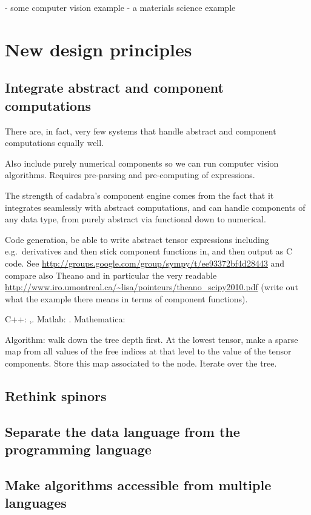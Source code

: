 \documentclass[11pt]{article}
\begin{document}
- some computer vision example
- a materials science example


\section{New design principles}
\subsection{Integrate abstract and component computations}

There are, in fact, very few systems that handle abstract and
component computations equally well.

Also include purely numerical components so we can run computer vision
algorithms. Requires pre-parsing and pre-computing of expressions.

The strength of cadabra's component engine comes from the fact that it
integrates seamlessly with abstract computations, and can handle
components of any data type, from purely abstract via functional down
to numerical.

Code generation, be able to write abstract tensor expressions
including e.g.~derivatives and then stick component functions in, and
then output as C code. See
\url{http://groups.google.com/group/sympy/t/ee93372bf4d28443}
and compare also Theano and in particular the
very readable \url{http://www.iro.umontreal.ca/~lisa/pointeurs/theano_scipy2010.pdf}
(write out what the example there means in terms of component functions).

C++: \cite{ltensor},\cite{ftensor}.
Matlab: \cite{TTB_Software}.
Mathematica: \cite{kranc}

Algorithm: walk down the tree depth first. At the lowest tensor, make
a sparse map from all values of the free indices at that level to the
value of the tensor components. Store this map associated to the
node. Iterate over the tree.


\subsection{Rethink spinors}

\subsection{Separate the data language from the programming language}

\subsection{Make algorithms accessible from multiple languages}
\end{document}
